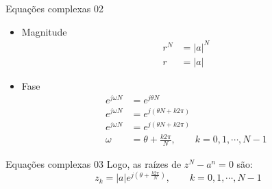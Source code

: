 \begin{note}{Equações complexas 02}

\begin{itemize}
   \item Magnitude
      \begin{align*}
          r^N &= |a|^N\\
          r   &= |a|
      \end{align*}
   \item Fase
      \begin{align*}
          e^{j\omega N} &= e^{j\theta N}\\
          e^{j\omega N} &= e^{j(\theta N + k2\pi )}\\
          e^{j\omega N} &= e^{j(\theta N + k2\pi )}\\
          \omega  &= \theta + \frac{k2\pi}{N}, \qquad k = 0,1,\cdots ,N-1
      \end{align*}
   \end{itemize}
\end{note}

\begin{note}{Equações complexas 03}
      Logo, as raízes de $z^N-a^n =0$ são:
      \begin{equation*}
         z_k = |a|e^{j(\theta + \frac{k2\pi}{N})}, \qquad k = 0,1,\cdots ,N-1
      \end{equation*}
\end{note}

